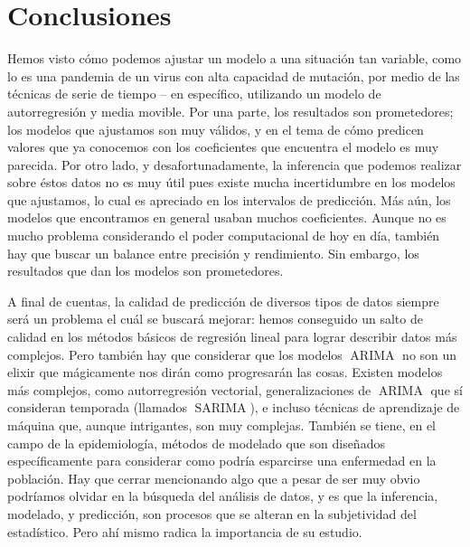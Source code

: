 \documentclass[11pt,letterpaper]{article}
\newcommand{\ARIMA}{\ensuremath{\operatorname{ARIMA}}}
\theoremstyle{definition}
\theoremstyle{theorem}
\theoremstyle{remark}
\begin{document}
	\section{Conclusiones}
	\noindent Hemos visto cómo podemos ajustar un modelo a una situación tan variable, como lo es una pandemia de un virus con alta capacidad de mutación, por medio de las técnicas de serie de tiempo -- en específico, utilizando un modelo de autorregresión y media movible. Por una parte, los resultados son prometedores; los modelos que ajustamos son muy válidos, y en el tema de cómo predicen valores que ya conocemos con los coeficientes que encuentra el modelo es muy parecida. Por otro lado, y desafortunadamente, la inferencia que podemos realizar sobre éstos datos no es muy útil pues existe mucha incertidumbre en los modelos que ajustamos, lo cual es apreciado en los intervalos de predicción. Más aún, los modelos que encontramos en general usaban muchos coeficientes. Aunque no es mucho problema considerando el poder computacional de hoy en día, también hay que buscar un balance entre precisión y rendimiento. Sin embargo, los resultados que dan los modelos son prometedores.
	\par A final de cuentas, la calidad de predicción de diversos tipos de datos siempre será un problema el cuál se buscará mejorar: hemos conseguido un salto de calidad en los métodos básicos de regresión lineal para lograr describir datos más complejos. Pero también hay que considerar que los modelos \(\ARIMA\) no son un elixir que mágicamente nos dirán como progresarán las cosas. Existen modelos más complejos, como autorregresión vectorial, generalizaciones de \(\ARIMA\) que sí consideran temporada (llamados \(\operatorname{SARIMA}\)), e incluso técnicas de aprendizaje de máquina que, aunque intrigantes, son muy complejas. También se tiene, en el campo de la epidemiología, métodos de modelado que son diseñados específicamente para considerar como podría esparcirse una enfermedad en la población. Hay que cerrar mencionando algo que a pesar de ser muy obvio podríamos olvidar en la búsqueda del análisis de datos, y es que la inferencia, modelado, y predicción, son procesos que se alteran en la subjetividad del estadístico. Pero ahí mismo radica la importancia de su estudio.
	\clearpage
\end{document}
